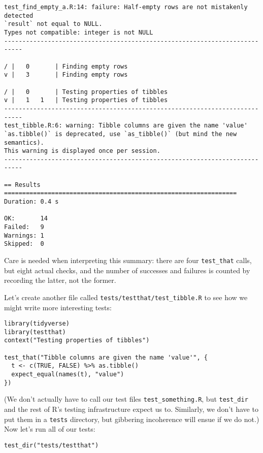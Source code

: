 \begin{lstlisting}
test_find_empty_a.R:14: failure: Half-empty rows are not mistakenly detected
`result` not equal to NULL.
Types not compatible: integer is not NULL
---------------------------------------------------------------------------

/ |   0       | Finding empty rows
v |   3       | Finding empty rows

/ |   0       | Testing properties of tibbles
v |   1   1   | Testing properties of tibbles
---------------------------------------------------------------------------
test_tibble.R:6: warning: Tibble columns are given the name 'value'
`as.tibble()` is deprecated, use `as_tibble()` (but mind the new semantics).
This warning is displayed once per session.
---------------------------------------------------------------------------

== Results ================================================================
Duration: 0.4 s

OK:       14
Failed:   9
Warnings: 1
Skipped:  0
\end{lstlisting}

\noindent
Care is needed when interpreting this summary:
there are four \texttt{test\_that} calls,
but eight actual checks,
and the number of successes and failures is counted by recording the latter,
not the former.

Let's create another file called \texttt{tests/testthat/test\_tibble.R}
to see how we might write more interesting tests:

\begin{lstlisting}
library(tidyverse)
library(testthat)
context("Testing properties of tibbles")

test_that("Tibble columns are given the name 'value'", {
  t <- c(TRUE, FALSE) %>% as.tibble()
  expect_equal(names(t), "value")
})
\end{lstlisting}

\noindent
(We don't actually have to call our test files \texttt{test\_something.R},
but \texttt{test\_dir} and the rest of R's testing infrastructure expect us to.
Similarly,
we don't have to put them in a \texttt{tests} directory,
but gibbering incoherence will ensue if we do not.)
Now let's run all of our tests:

\begin{lstlisting}
test_dir("tests/testthat")
\end{lstlisting}

